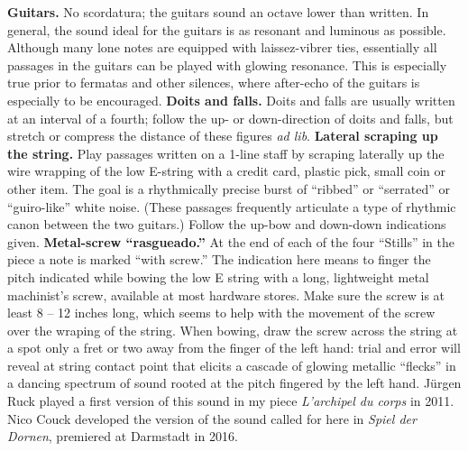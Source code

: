 \textbf{Guitars.} No scordatura; the guitars sound an octave lower than
written. In general, the sound ideal for the guitars is as resonant and
luminous as possible. Although many lone notes are equipped with laissez-vibrer
ties, essentially all passages in the guitars can be played with glowing
resonance. This is especially true prior to fermatas and other silences, where
after-echo of the guitars is especially to be encouraged. \textbf{Doits and
falls.} Doits and falls are usually written at an interval of a fourth; follow
the up- or down-direction of doits and falls, but stretch or compress the
distance of these figures \textit{ad lib}. \textbf{Lateral scraping up the
string.} Play passages written on a 1-line staff by scraping laterally up the
wire wrapping of the low E-string with a credit card, plastic pick, small coin
or other item. The goal is a rhythmically precise burst of ``ribbed'' or
``serrated'' or ``guiro-like'' white noise. (These passages frequently
articulate a type of rhythmic canon between the two guitars.) Follow the up-bow
and down-down indications given. \textbf{Metal-screw ``rasgueado.''} At the end
of each of the four ``Stills'' in the piece a note is marked ``with screw.''
The indication here means to finger the pitch indicated while bowing the low E
string with a long, lightweight metal machinist's screw, available at most
hardware stores. Make sure the screw is at least 8 -- 12 inches long, which
seems to help with the movement of the screw over the wraping of the string.
When bowing, draw the screw across the string at a spot only a fret or two away
from the finger of the left hand: trial and error will reveal at string contact
point that elicits a cascade of glowing metallic ``flecks'' in a dancing
spectrum of sound rooted at the pitch fingered by the left hand. Jürgen Ruck
played a first version of this sound in my piece \textit{L'archipel du corps}
in 2011. Nico Couck developed the version of the sound called for here in
\textit{Spiel der Dornen}, premiered at Darmstadt in 2016.

\break

